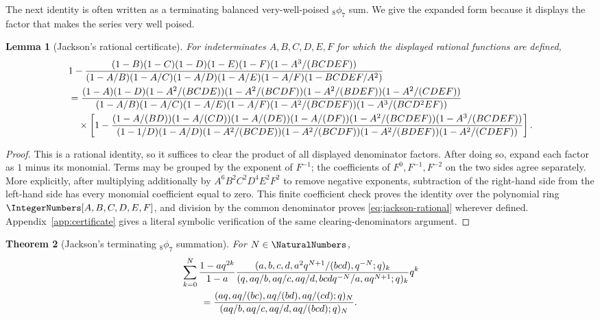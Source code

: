 \documentclass[11pt,oneside]{article}
\newtheorem{theorem}{Theorem}[section]
\newtheorem{lemma}[theorem]{Lemma}
\theoremstyle{definition}
\begin{document}
The next identity is often written as a terminating balanced very-well-poised ${}_8\phi_7$ sum. We give the expanded form because it displays the factor that makes the series very well poised.

\begin{lemma}[Jackson's rational certificate]\label{lem:jackson-rational}
For indeterminates $A,B,C,D,E,F$ for which the displayed rational functions are defined,
\begingroup
\small
\begin{align}
&1-
 \frac{(1-B)(1-C)(1-D)(1-E)(1-F)(1-A^3/(BCDEF))}
 {(1-A/B)(1-A/C)(1-A/D)(1-A/E)(1-A/F)(1-BCDEF/A^2)}
 \notag\\
&=\frac{(1-A)(1-D)(1-A^2/(BCDE))(1-A^2/(BCDF))
 (1-A^2/(BDEF))(1-A^2/(CDEF))}
 {(1-A/B)(1-A/C)(1-A/E)(1-A/F)
 (1-A^2/(BCDEF))(1-A^3/(BCD^2EF))}
 \notag\\
&\quad\times\left[
 1-
 \frac{(1-A/(BD))(1-A/(CD))(1-A/(DE))(1-A/(DF))
 (1-A^2/(BCDEF))(1-A^3/(BCDEF))}
 {(1-1/D)(1-A/D)(1-A^2/(BCDE))(1-A^2/(BCDF))
 (1-A^2/(BDEF))(1-A^2/(CDEF))}
 \right].
\label{eq:jackson-rational}
\end{align}
\endgroup
\end{lemma}

\begin{proof}
This is a rational identity, so it suffices to clear the product of all displayed denominator factors. After doing so, expand each factor as $1$ minus its monomial. Terms may be grouped by the exponent of $F^{-1}$; the coefficients of $F^0,F^{-1},F^{-2}$ on the two sides agree separately. More explicitly, after multiplying additionally by $A^6B^2C^2D^4E^2F^2$ to remove negative exponents, subtraction of the right-hand side from the left-hand side has every monomial coefficient equal to zero. This finite coefficient check proves the identity over the polynomial ring
$\IntegerNumbers[A,B,C,D,E,F]$, and division by the common denominator proves
\eqref{eq:jackson-rational} wherever defined. Appendix~\ref{app:certificate} gives a literal symbolic verification of the same clearing-denominators argument.
\end{proof}

\begin{theorem}[Jackson's terminating ${}_8\phi_7$ summation]\label{thm:jackson-8phi7}
For $N\in\NaturalNumbers$,
\begin{align}
&\sum_{k=0}^{N}
 \frac{1-aq^{2k}}{1-a}
 \frac{(a,b,c,d,a^2q^{N+1}/(bcd),q^{-N};q)_k}
 {(q,aq/b,aq/c,aq/d,bcdq^{-N}/a,aq^{N+1};q)_k}q^k
 \notag\\
&\qquad=
 \frac{(aq,aq/(bc),aq/(bd),aq/(cd);q)_N}
 {(aq/b,aq/c,aq/d,aq/(bcd);q)_N}.
\label{eq:jackson-8phi7}
\end{align}
\end{theorem}
\end{document}
